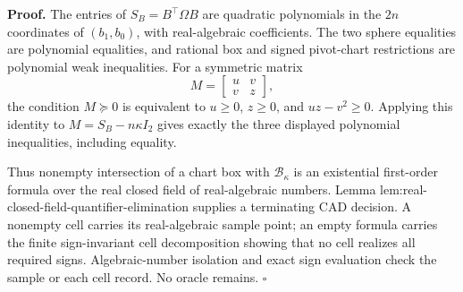 \textbf{Proof.}
The entries of \(S_B=B^{\top}\Omega B\) are quadratic polynomials in the \(2n\) coordinates of \((b_1,b_0)\), with real-algebraic coefficients.  The two sphere equalities are polynomial equalities, and rational box and signed pivot-chart restrictions are polynomial weak inequalities.  For a symmetric matrix
\[
 M=\begin{bmatrix}u&v\\v&z\end{bmatrix},
\]
the condition \(M\succeq0\) is equivalent to \(u\ge0\), \(z\ge0\), and \(uz-v^2\ge0\).  Applying this identity to \(M=S_B-n\kappa I_2\) gives exactly the three displayed polynomial inequalities, including equality.

Thus nonempty intersection of a chart box with \(\mathcal B_\kappa\) is an existential first-order formula over the real closed field of real-algebraic numbers.  Lemma lem:real-closed-field-quantifier-elimination supplies a terminating CAD decision.  A nonempty cell carries its real-algebraic sample point; an empty formula carries the finite sign-invariant cell decomposition showing that no cell realizes all required signs.  Algebraic-number isolation and exact sign evaluation check the sample or each cell record.  No oracle remains. \(\square\)